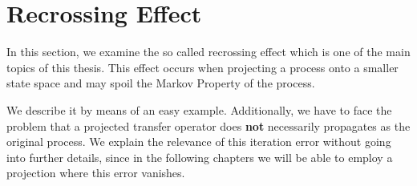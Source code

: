 \section{Recrossing Effect}
\label{sec:recrossing}


In this section, we examine the so called recrossing effect which is one of the main topics of this thesis.
This effect occurs when projecting a process onto a smaller state space and may spoil the Markov Property of the process. %

We describe it by means of an easy example. %
Additionally, we have to face the problem that a projected transfer operator does \textbf{not} necessarily propagates as the original process. We explain the relevance of this iteration error without going into further details, since in the following chapters we will be able to employ a projection where this error vanishes. %



